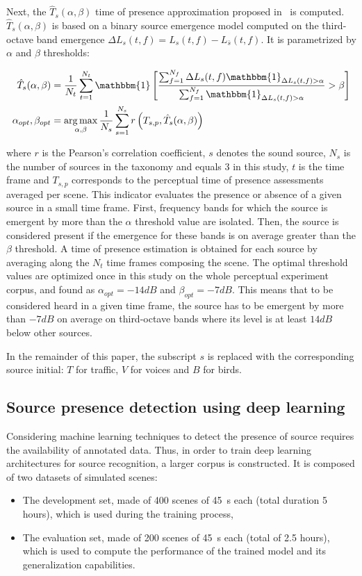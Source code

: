 \documentclass[twocolumn]{article}
\DeclareMathOperator*{\argmax}{arg\,max}
\begin{document}
Next, the $\hat T_s(\alpha, \beta)$ time of presence approximation proposed in~\cite{gontier2018} is computed. $\hat T_s(\alpha, \beta)$ is based on a binary source emergence model computed on the third-octave band emergence $\Delta L_{s}(t, f) = L_s(t, f) - L_{\bar{s}}(t, f)$. It is parametrized by $\alpha$ and $\beta$ thresholds:

\begin{align}
\hat T_s(\alpha, \beta) &= \frac{1}{N_t}\sum_{t = 1}^{N_t}\mathbbm{1}\left[ \frac{\sum_{f = 1}^{N_f}\Delta L_{s}(t, f)\mathbbm{1}_{\Delta L_{s}(t, f)>\alpha}}{\sum_{f = 1}^{N_f}\mathbbm{1}_{\Delta L_{s}(t, f)>\alpha}}>\beta \right]\\
\alpha_{opt},\beta_{opt} &= \argmax_{\alpha, \beta}\frac{1}{N_s}\sum_{s = 1}^{N_s}r\left(T_{s, p}, \hat T_s(\alpha, \beta)\right)
\end{align}

where $r$ is the Pearson's correlation coefficient, $s$ denotes the sound source, $N_s$ is the number of sources in the taxonomy and equals 3 in this study, $t$ is the time frame and $T_{s, p}$ corresponds to the perceptual time of presence assessments averaged per scene. This indicator evaluates the presence or absence of a given source in a small time frame. First, frequency bands for which the source is emergent by more than the $\alpha$ threshold value are isolated. Then, the source is considered present if the emergence for these bands is on average greater than the $\beta$ threshold. A time of presence estimation is obtained for each source by averaging along the $N_t$ time frames composing the scene. The optimal threshold values are optimized once in this study on the whole perceptual experiment corpus, and found as $\alpha_{opt} = -14dB$ and $\beta_{opt} = -7dB$. This means that to be considered heard in a given time frame, the source has to be emergent by more than $-7dB$ on average on third-octave bands where its level is at least $14dB$ below other sources.

In the remainder of this paper, the subscript $s$ is replaced with the corresponding source initial: $T$ for traffic, $V$ for voices and $B$ for birds.


\subsection{Source presence detection using deep learning}
\label{sec:methods_deep}

Considering machine learning techniques to detect the presence of source requires the availability of annotated data. Thus, in order to train deep learning architectures for source recognition, a larger corpus is constructed. It is composed of two datasets of simulated scenes:
\begin{itemize}
\item The development set, made of 400 scenes of 45~s each (total duration 5 hours), which is used during the training process,
\item The evaluation set, made of 200 scenes of 45~s each (total of 2.5 hours), which is used to compute the performance of the trained model and its generalization capabilities.
\end{itemize}
\end{document}
